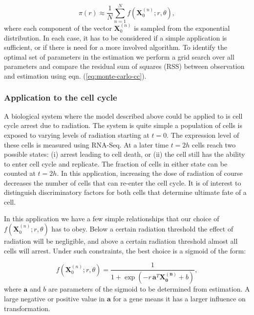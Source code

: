 \begin{equation}
  \label{eq:monte-carlo-cc}
  \pi(r) \approx \frac{1}{N} \sum_{n = 1}^N f(\mathbf{X}_0^{(n)}; r, \theta),
\end{equation}
where each component of the vector $\mathbf{X}_0^{(n)}$ is sampled from the exponential distribution. In each case, it has to be considered if a simple application is sufficient, or if there is need for a more involved algorithm. To identify the optimal set of parameters in the estimation we perform a grid search over all parameters and compare the residual sum of squares (RSS) between observation and estimation using eqn. (\ref{eq:monte-carlo-cc}).

\subsubsection{Application to the cell cycle}
\label{sec:application-cc}

A biological system where the model described above could be applied to is cell cycle arrest due to radiation. The system is quite simple a population of cells is exposed to varying levels of radiation starting at $t=0$. The expression level of these cells is measured using RNA-Seq. At a later time $t=2h$ cells reach two possible states: (i) arrest leading to cell death, or (ii) the cell still has the ability to enter cell cycle and replicate. The fraction of cells in either state can be counted at $t=2h$. In this application, increasing the dose of radiation of course decreases the number of cells that can re-enter the cell cycle. It is of interest to distinguish discriminatory factors for both cells that determine ultimate fate of a cell.

In this application we have a few simple relationships that our choice of $f(\mathbf{X}_0^{(n)}; r, \theta)$ has to obey. Below a certain radiation threshold the effect of radiation will be negligible, and above a certain radiation threshold almost all cells will arrest. Under such constraints, the best choice is a sigmoid of the form:

\begin{equation}
  \label{eq:sigmoid-cc}
  f(\mathbf{X}_0^{(n)}; r, \theta) = \frac{1}{1 + \exp ( -r\, \mathbf{a}^T \mathbf{X_0^{(n)}} + b)},
\end{equation}
where $\mathbf{a}$ and $b$ are parameters of the sigmoid to be determined from estimation. A large negative or positive value in $\mathbf{a}$ for a gene means it has a larger influence on transformation.

